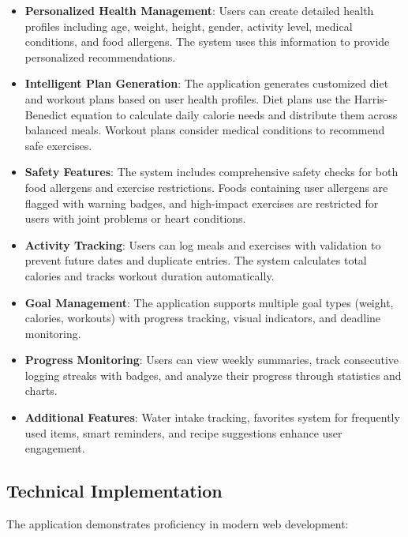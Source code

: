 \begin{itemize}
    \item \textbf{Personalized Health Management}: Users can create detailed health profiles including age, weight, height, gender, activity level, medical conditions, and food allergens. The system uses this information to provide personalized recommendations.
    
    \item \textbf{Intelligent Plan Generation}: The application generates customized diet and workout plans based on user health profiles. Diet plans use the Harris-Benedict equation to calculate daily calorie needs and distribute them across balanced meals. Workout plans consider medical conditions to recommend safe exercises.
    
    \item \textbf{Safety Features}: The system includes comprehensive safety checks for both food allergens and exercise restrictions. Foods containing user allergens are flagged with warning badges, and high-impact exercises are restricted for users with joint problems or heart conditions.
    
    \item \textbf{Activity Tracking}: Users can log meals and exercises with validation to prevent future dates and duplicate entries. The system calculates total calories and tracks workout duration automatically.
    
    \item \textbf{Goal Management}: The application supports multiple goal types (weight, calories, workouts) with progress tracking, visual indicators, and deadline monitoring.
    
    \item \textbf{Progress Monitoring}: Users can view weekly summaries, track consecutive logging streaks with badges, and analyze their progress through statistics and charts.
    
    \item \textbf{Additional Features}: Water intake tracking, favorites system for frequently used items, smart reminders, and recipe suggestions enhance user engagement.
\end{itemize}

\subsection{Technical Implementation}

The application demonstrates proficiency in modern web development:

